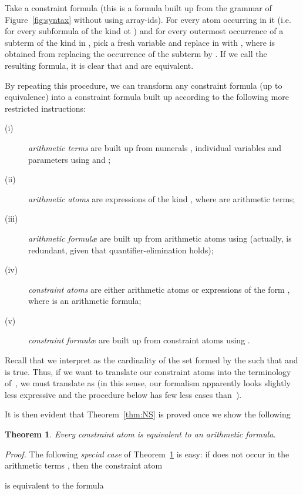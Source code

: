 \documentclass[11pt,a4paper]{article}
\newcommand{\formulae}{formul\ae\xspace}
\newtheorem{theorem}{Theorem}
\begin{document}
{Take a constraint formula   (this is a formula built up from the  grammar of Figure~\ref{fig:syntax} without using
 array-ids). For every atom  occurring in it (i.e. for every subformula of the kind  ot )
 and for every outermost occurrence of a subterm of the kind  in , pick a fresh variable  and replace 
 in  with 
 , where  is obtained from  replacing the occurrence of the 
 subterm  by . If we call  the resulting formula, it is clear that  and  are equivalent.
 
 By repeating this procedure, we can transform any constraint formula (up to equivalence) into a constraint formula built up according to the following
 more restricted instructions:
\begin{description}
  \item[{\rm (i)}] \emph{arithmetic terms} are built up from numerals , individual variables  and parameters  using  and ;
  \item[{\rm (ii)}] \emph{arithmetic atoms} are expressions of the kind , where  are arithmetic terms;
  \item[{\rm (iii)}] \emph{arithmetic \formulae} are built up from arithmetic atoms using  (actually,  is redundant, given that quantifier-elimination holds);
  \item[{\rm (iv)}] \emph{constraint atoms} are either arithmetic atoms or expressions of the form , where  is an arithmetic formula;
  \item[{\rm (v)}] \emph{constraint \formulae} are built up from constraint atoms using  .
 \end{description}

Recall that we interpret   as the cardinality of the set formed by the  such that  and  is true. Thus, if we want to translate our 
constraint atoms into the terminology of~\cite{schweikhart}, we must translate  as 
(in this sense, our formalism apparently looks slightly less expressive and the procedure below has few less cases than~\cite{schweikhart}).
 
 
 It is then evident that Theorem~\ref{thm:NS} is proved once 
we show the following 
\begin{theorem}\label{thm:NS1}
 Every constraint atom is equivalent to an arithmetic formula.
\end{theorem}

\noindent
\textit{Proof.}
The following \emph{special case} of Theorem~\ref{thm:NS1} is easy: if  does not occur in the arithmetic terms , then 
the constraint atom  

 is equivalent to the formula
 
}
\end{document}

